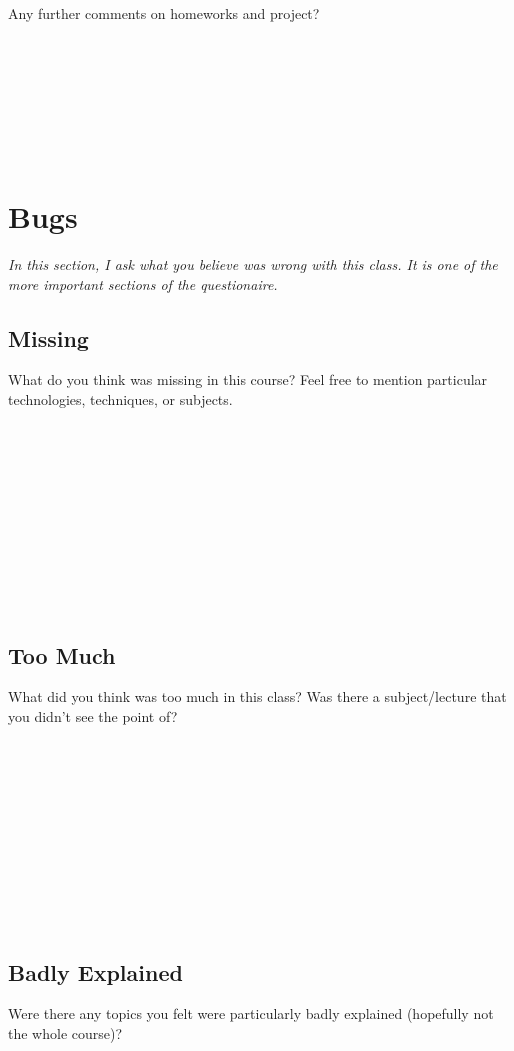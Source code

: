 \documentclass[article,twoside]{memoir}
\newcommand*{\fillunderscore}{~\hrulefill}
\newcommand{\header}[1]{\textsl{#1}\par\medskip}
\begin{document}
Any further comments on homeworks and project?

\fillunderscore\par
\fillunderscore\par
\fillunderscore\par
\fillunderscore\par

\chapter{Bugs}

\header{In this section, I ask what you believe was wrong with this class. It is one of the more important sections of the questionaire.}

\section{Missing}

What do you think was missing in this course? Feel free to mention particular technologies, techniques, or subjects.

\fillunderscore\par
\fillunderscore\par
\fillunderscore\par
\fillunderscore\par
\fillunderscore\par
\fillunderscore\par


\section{Too Much}

What did you think was too much in this class? Was there a subject/lecture that you didn't see the point of?

\fillunderscore\par
\fillunderscore\par
\fillunderscore\par
\fillunderscore\par
\fillunderscore\par
\fillunderscore\par

\clearpage
\section{Badly Explained}

Were there any topics you felt were particularly badly explained (hopefully not the whole course)?
\end{document}
